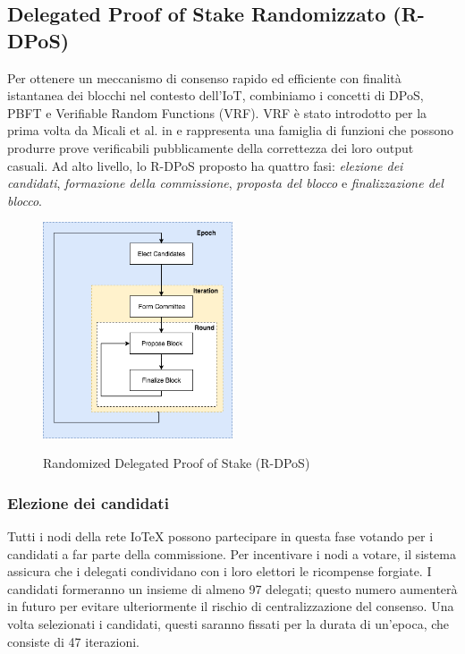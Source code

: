 \subsection{Delegated Proof of Stake Randomizzato (R-DPoS)}
Per ottenere un meccanismo di consenso rapido ed efficiente con finalità istantanea dei blocchi nel contesto dell'IoT, combiniamo i concetti di DPoS, PBFT e Verifiable Random Functions (VRF). VRF è stato introdotto per la prima volta da Micali et al. in \cite{c19} e rappresenta una famiglia di funzioni che possono produrre prove verificabili pubblicamente della correttezza dei loro output casuali. Ad alto livello, lo R-DPoS proposto ha quattro fasi: \emph{elezione dei candidati}, \emph{formazione della commissione}, \emph{proposta del blocco} e \emph{finalizzazione del blocco}.

\begin{figure}[ht]
	\centering
	\includegraphics[width=0.5\textwidth]{Figura6}
	\label{fig:figure6}
	\caption{Randomized Delegated Proof of Stake (R-DPoS)}
\end{figure}

\subsubsection{Elezione dei candidati}
Tutti i nodi della rete IoTeX possono partecipare in questa fase votando per i candidati a far parte della commissione. Per incentivare i nodi a votare, il sistema assicura che i delegati condividano con i loro elettori le ricompense forgiate. I candidati formeranno un insieme di almeno 97 delegati; questo numero aumenterà in futuro per evitare ulteriormente il rischio di centralizzazione del consenso. Una volta selezionati i candidati, questi saranno fissati per la durata di un'epoca, che consiste di 47 iterazioni.

